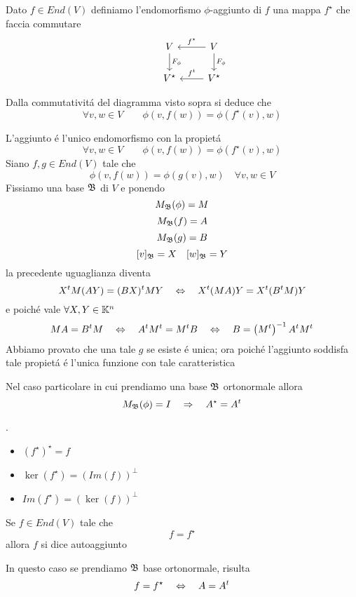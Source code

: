 \begin{defn}[Aggiunto]\bianco
Dato $f\in End(V) $ definiamo l'endomorfismo $\phi$-aggiunto di $f$ una mappa $f^\star$ che faccia commutare 
$$ \begin{tikzcd}
& V\arrow{d}{F_\phi}
\arrow[leftarrow] {r}{f^\star} &V \arrow{d}{F_\phi}\\
&V^\star \arrow[leftarrow] {r}{f^t} &V^\star
\end{tikzcd}$$
\end{defn}
\spazio
\begin{oss}Dalla commutativit\'a del diagramma visto sopra si deduce che
$$ \forall v, w \in V \qquad \phi(v,f(w))= \phi \left( f^\star (v),  w \right)$$
\end{oss}
\spazio
\begin{prop}L'aggiunto \'e l'unico endomorfismo con la propiet\'a 
$$ \forall v, w \in V \qquad \phi(v,f(w))= \phi \left( f^\star (v),  w \right)$$
\proof
Siano $f,g\in End(V)$ tale che 
$$ \phi(v,f(w))= \phi(g(v),w) \quad \forall v,w\in V $$
Fissiamo una base $\mathfrak{B}$ di $V$ e ponendo 
$$ M_{\mathfrak{B}}(\phi)=M $$
$$ M_{\mathfrak{B}}(f)=A$$
$$ M_{\mathfrak{B}}(g)=B $$
$$ [v]_{\mathfrak{B}} = X \quad [w]_{\mathfrak{B}}=Y$$
la precedente uguaglianza diventa
$$ X^t M (AY)= (BX)^t M Y \quad \Leftrightarrow \quad X^t ( MA) Y = X^t (B^t M ) Y $$ 
e poich\'e vale $\forall X,Y \in \mathbb{K}^n $
$$ MA = B^t M \quad \Leftrightarrow \quad A^t M^t = M^t B \quad \Leftrightarrow \quad B = \left( M^t \right)^{-1} A^t M^t $$
Abbiamo provato che una tale $g$ se esiste \'e unica; ora poich\'e l'aggiunto soddisfa tale propiet\'a \'e l'unica funzione con tale caratteristica
\endproof
\begin{oss}
Nel caso particolare in cui prendiamo una base $\mathfrak{B}$ ortonormale allora $$M_{\mathfrak{B}}(\phi)= I \quad \Rightarrow \quad A^\star = A^t $$
\end{oss}
\end{prop}
\spazio
\begin{prop} .
\begin{itemize}
\item $ \left( f^\star \right)^\star = f $
\item $\ker(f^\star) = \left( Im (f) \right)^\perp$
\item $Im(f^\star) = \left( \ker (f) \right)^\perp$
\end{itemize}
\end{prop}

\spazio
\begin{defn}[Autoaggiunto] Se $f \in End(V) $ tale che 
$$ f = f^\star $$ 
allora $f$ si dice autoaggiunto
\begin{oss}In questo caso se prendiamo $\mathfrak{B}$ base ortonormale, risulta
$$ f=f^\star \quad \Leftrightarrow \quad A=A^t $$
\end{oss}
\end{defn}


